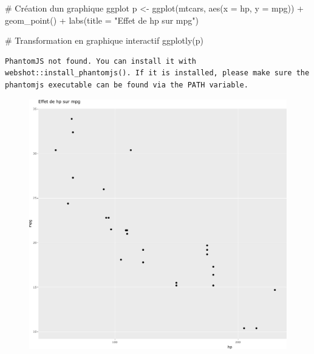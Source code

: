 \documentclass[
  letterpaper,
  DIV=11,
  numbers=noendperiod]{scrreprt}
\newenvironment{Shaded}{\begin{snugshade}}{\end{snugshade}}
\newcommand{\AttributeTok}[1]{\textcolor[rgb]{0.40,0.45,0.13}{#1}}
\newcommand{\CommentTok}[1]{\textcolor[rgb]{0.37,0.37,0.37}{#1}}
\newcommand{\FunctionTok}[1]{\textcolor[rgb]{0.28,0.35,0.67}{#1}}
\newcommand{\NormalTok}[1]{\textcolor[rgb]{0.00,0.23,0.31}{#1}}
\newcommand{\OtherTok}[1]{\textcolor[rgb]{0.00,0.23,0.31}{#1}}
\newcommand{\SpecialCharTok}[1]{\textcolor[rgb]{0.37,0.37,0.37}{#1}}
\newcommand{\StringTok}[1]{\textcolor[rgb]{0.13,0.47,0.30}{#1}}
\begin{document}
\begin{Shaded}
\begin{Highlighting}[]
\CommentTok{\# Création d\textquotesingle{}un graphique ggplot}
\NormalTok{p }\OtherTok{\textless{}{-}} \FunctionTok{ggplot}\NormalTok{(mtcars, }\FunctionTok{aes}\NormalTok{(}\AttributeTok{x =}\NormalTok{ hp, }\AttributeTok{y =}\NormalTok{ mpg)) }\SpecialCharTok{+}
  \FunctionTok{geom\_point}\NormalTok{() }\SpecialCharTok{+}
  \FunctionTok{labs}\NormalTok{(}\AttributeTok{title =} \StringTok{"Effet de hp sur mpg"}\NormalTok{)}

\CommentTok{\# Transformation en graphique interactif}
\FunctionTok{ggplotly}\NormalTok{(p)}
\end{Highlighting}
\end{Shaded}

\begin{verbatim}
PhantomJS not found. You can install it with webshot::install_phantomjs(). If it is installed, please make sure the phantomjs executable can be found via the PATH variable.
\end{verbatim}

\begin{figure}[H]

{\centering \includegraphics{chapitre_6_files/figure-pdf/unnamed-chunk-13-1.pdf}

}

\end{figure}
\end{document}
